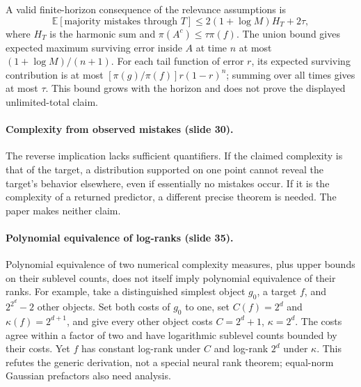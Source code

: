 \documentclass[11pt]{article}
\newcommand{\E}{\mathbb E}
\begin{document}
A valid finite-horizon consequence of the relevance assumptions is
\[
 \E[\text{majority mistakes through }T]
 \leq2(1+\log M)H_T+2\tau,
\]
where $H_T$ is the harmonic sum and $\pi(A^c)\leq\tau\pi(f)$. The union bound gives expected maximum surviving error inside $A$ at time $n$ at most $(1+\log M)/(n+1)$. For each tail function of error $r$, its expected surviving contribution is at most $[\pi(g)/\pi(f)]r(1-r)^n$; summing over all times gives at most $\tau$. This bound grows with the horizon and does not prove the displayed unlimited-total claim.

\paragraph{Complexity from observed mistakes (slide 30).}
The reverse implication lacks sufficient quantifiers. If the claimed complexity is that of the target, a distribution supported on one point cannot reveal the target's behavior elsewhere, even if essentially no mistakes occur. If it is the complexity of a returned predictor, a different precise theorem is needed. The paper makes neither claim.

\paragraph{Polynomial equivalence of log-ranks (slide 35).}
Polynomial equivalence of two numerical complexity measures, plus upper bounds on their sublevel counts, does not itself imply polynomial equivalence of their ranks. For example, take a distinguished simplest object $g_0$, a target $f$, and $2^{2^d}-2$ other objects. Set both costs of $g_0$ to one, set $C(f)=2^d$ and $\kappa(f)=2^{d+1}$, and give every other object costs $C=2^d+1$, $\kappa=2^d$. The costs agree within a factor of two and have logarithmic sublevel counts bounded by their costs. Yet $f$ has constant log-rank under $C$ and log-rank $2^d$ under $\kappa$. This refutes the generic derivation, not a special neural rank theorem; equal-norm Gaussian prefactors also need analysis.
\end{document}
